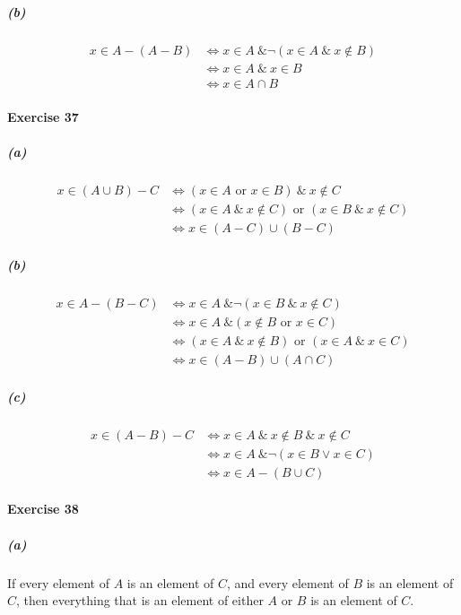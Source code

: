 \documentclass{report}
\begin{document}
    \subparagraph{(b)}
    \begin{align*}
        x \in A - (A - B) & \Leftrightarrow x \in A \ \& \neg (x \in A \ \&\ x \notin B) \\
        & \Leftrightarrow x \in A \ \& \ x \in B \\
        & \Leftrightarrow x \in A \cap B
    \end{align*}

    \paragraph{Exercise 37}
    \subparagraph{(a)}
    \begin{align*}
        x \in (A \cup B) - C & \Leftrightarrow (x \in A \text{ or } x \in B) \ \&\ x \notin C \\
        & \Leftrightarrow (x \in A \ \&\ x \notin C) \text{ or } (x \in B \ \&\ x \notin C) \\
        & \Leftrightarrow x \in (A - C) \cup (B - C)
    \end{align*}

    \subparagraph{(b)}
    \begin{align*}
        x \in A - (B - C) & \Leftrightarrow x \in A \ \& \neg (x \in B \ \&\ x \notin C) \\
        & \Leftrightarrow x \in A \ \& (x \notin B \text{ or } x \in C) \\
        & \Leftrightarrow (x \in A \ \&\ x \notin B) \text{ or } (x \in A \ \&\ x \in C) \\
        & \Leftrightarrow x \in (A - B) \cup (A \cap C)
    \end{align*}

    \subparagraph{(c)}
    \begin{align*}
        x \in (A - B) - C & \Leftrightarrow x \in A \ \&\ x \notin B \ \&\ x \notin C \\
        & \Leftrightarrow x \in A \ \& \neg (x \in B \vee x \in C) \\
        & \Leftrightarrow x \in A - (B \cup C)
    \end{align*}
    
    \paragraph{Exercise 38}
    \subparagraph{(a)}
    If every element of $A$ is an element of $C$, and every element of $B$ is an element of $C$,
    then everything that is an element of either $A$ or $B$ is an element of $C$.
\end{document}
